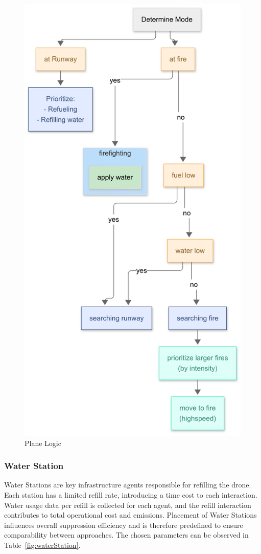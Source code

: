 \documentclass[twoside]{article}
\begin{document}
\begin{figure}[H]
    \centering
    \includegraphics[width=0.6\linewidth]{figures/plane_logic.png}
    \caption{Plane Logic}
    \label{fig:planeLogic}
\end{figure}
\newpage

\subsubsection{Water Station}
\label{sec:WaterStation}
Water Stations are key infrastructure agents responsible for refilling the drone. Each station has a limited refill rate, introducing a time cost to each interaction. Water usage data per refill is collected for each agent, and the refill interaction contributes to total operational cost and emissions. Placement of Water Stations influences overall suppression efficiency and is therefore predefined to ensure comparability between approaches. The chosen parameters can be observed in Table~\ref{fig:waterStation}.
\end{document}
